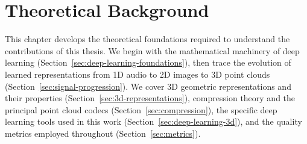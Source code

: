 \chapter{Theoretical Background}
\label{ch:background}

This chapter develops the theoretical foundations required to understand
the contributions of this thesis.
We begin with the mathematical machinery of deep learning
(Section~\ref{sec:deep-learning-foundations}),
then trace the evolution of learned representations from 1D audio to
2D images to 3D point clouds
(Section~\ref{sec:signal-progression}).
We cover 3D geometric representations and their properties
(Section~\ref{sec:3d-representations}),
compression theory and the principal point cloud codecs
(Section~\ref{sec:compression}),
the specific deep learning tools used in this work
(Section~\ref{sec:deep-learning-3d}),
and the quality metrics employed throughout
(Section~\ref{sec:metrics}).







